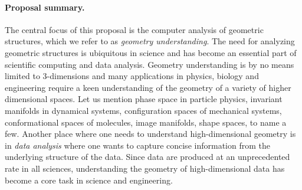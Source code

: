 \documentclass[a4paper, 11pt]{article}
\begin{document}
\paragraph{Proposal summary.} 
The central focus of this proposal is the computer analysis of
geometric structures, which we refer to as {\em geometry
  understanding}.  The need for analyzing geometric structures is
ubiquitous in science and has become an essential part of scientific
computing and data analysis. Geometry understanding is by no means
limited to 3-dimensions and many applications in physics, biology and
engineering require a keen understanding of the geometry of a variety
of higher dimensional spaces. Let us mention phase space in particle
physics, invariant manifolds in dynamical systems, configuration
spaces of mechanical systems, conformational spaces of molecules,
image manifolds, shape spaces, to name a few.
%
Another place where one needs to understand
high-dimensional geometry is in {\em data analysis} where one wants to
capture concise information from the underlying structure of the data.  %
Since data are produced at an unprecedented rate in all
sciences, understanding the geometry of high-dimensional data %
has become a core task in science and engineering.
\end{document}
